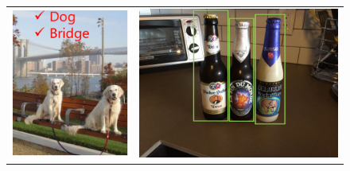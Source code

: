 \begin{figure}
    \begin{tabular}{cc}
    \includegraphics[scale=0.25]{./tex/computer-vision/object-recognition/classifim.png}&\includegraphics[scale=0.2]{./tex/computer-vision/object-recognition/detecobj.jpg}\\

\end{tabular}
\end{figure}
